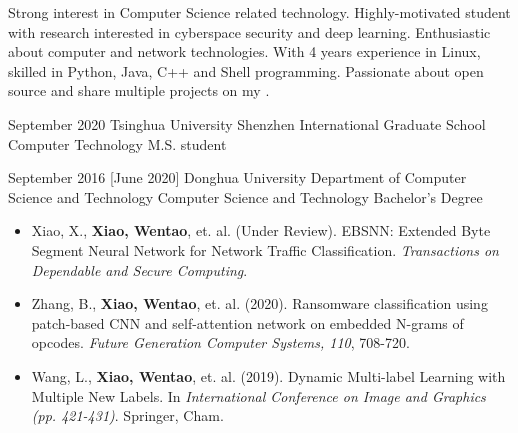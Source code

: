 \documentclass{resume}
\begin{document}
\makeheader

Strong interest in Computer Science related technology.
Highly-motivated student with research interested in cyberspace security and deep learning.
Enthusiastic about computer and network technologies.
With 4 years experience in Linux, skilled in Python, Java, C++ and Shell programming.
Passionate about open source and share multiple projects on my .

\begin{educations}
  \education%
    {September 2020}%
    {Tsinghua University}%
    {Shenzhen International Graduate School}%
    {Computer Technology}%
    {M.S. student}

  \separator{0.5ex}
  \education%
    {September 2016}%
    [June 2020]%
    {Donghua University}%
    {Department of Computer Science and Technology}%
    {Computer Science and Technology}%
    {Bachelor's Degree}
\end{educations}

\begin{itemize}
  \item Xiao, X., \textbf{Xiao, Wentao}, et. al. (Under Review). EBSNN: Extended Byte Segment Neural Network for Network Traffic Classification. \textit{Transactions on Dependable and Secure Computing}.
  \item Zhang, B., \textbf{Xiao, Wentao}, et. al. (2020). Ransomware classification using patch-based CNN and self-attention network on embedded N-grams of opcodes. \textit{Future Generation Computer Systems, 110}, 708-720.
  \item Wang, L., \textbf{Xiao, Wentao}, et. al. (2019). Dynamic Multi-label Learning with Multiple New Labels. In \textit{International Conference on Image and Graphics (pp. 421-431)}. Springer, Cham.
\end{itemize}

\begin{competences}[10em]
\end{competences}
\end{document}
